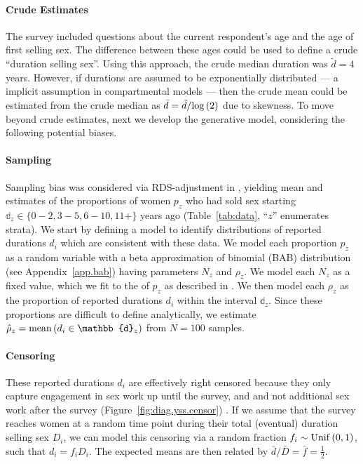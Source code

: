\paragraph{Crude Estimates}
The survey \cite{Baral2014} included questions about
the current respondent's age and the age of first selling sex.
The difference between these ages could be used to define a crude ``duration selling sex''.
Using this approach, the crude median duration was $\tilde{d} = 4$ years.
However, if durations are assumed to be exponentially distributed
--- a implicit assumption in compartmental models \cite{Anderson1991} ---
then the crude mean could be estimated from the crude median as
$\bar{d} = \tilde{d}/\mathrm{log}\,(2)$ due to skewness.
To move beyond crude estimates, next we develop the generative model,
considering the following potential biases.
\paragraph{Sampling}
Sampling bias was considered via RDS-adjustment in \cite{Baral2014},
yielding mean and \ci estimates of the proportions of women $p_z$
who had sold sex starting $\mathbb{d}_z \in \{0{-}2, 3{-}5, 6{-}10, 11+\}$ years ago
(Table~\ref{tab:data}, ``$z$'' enumerates strata).
We start by defining a model to identify distributions of reported durations $d_i$
which are consistent with these data.
We model each proportion $p_z$ as a random variable with
a beta approximation of binomial (BAB) distribution (see Appendix~\ref{app.bab})
having parameters $N_z$ and $\rho_z$.
We model each $N_z$ as a fixed value,
which we fit to the \ci of $p_z$ as described in .
We then model each $\rho_z$ as
the proportion of reported durations $d_i$ within the interval $\mathbb{d}_z$.
Since these proportions are difficult to define analytically,
we estimate $\hat{\rho}_z = \distr{mean}{d_i \in \mathbb{d}_z}$ from $N = 100$ samples.
\paragraph{Censoring}
These reported durations $d_i$ are effectively right censored
because they only capture engagement in sex work up until the survey, and
and not additional sex work after the survey
(Figure~\ref{fig:diag.yss.censor}) \cite{Fazito2012}.
If we assume that the survey reaches women at a random time point
during their total (eventual) duration selling sex $D_i$, we can model this censoring via
a random fraction $f_i \sim \mathrm{Unif}\,(0,1)$, such that $d_i = f_i D_i$.
The expected means are then related by $\bar{d} / \bar{D} = \bar{f} = \frac12$.
